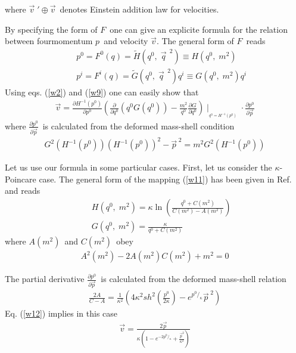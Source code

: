 \documentclass[a4paper,12pt]{article}
\begin{document}
where $\vec{v}\;' \oplus \vec{v}$\ denotes Einstein addition law for velocities.

By specifying the form of $F$\ one can give an explicite formula for the relation between fourmomentum $p$\ and
velocity $\vec{v}$. The general form of $F$\ reads
\begin{eqnarray}
&&p^0=F^0(q)=\tilde{H}(q^0,\;\vec{q}^{\;\;2})\equiv H(q^0,\;m^2)\nonumber \\
&&p^i=F^i(q)=\tilde{G}(q^0,\;\vec{q}^{\;\;2})q^i\equiv G(q^0,\;m^2)q^i \label{w11}
\end{eqnarray}
Using eqs. (\ref{w2}) and (\ref{w9}) one can easily show that
\begin{eqnarray}
\vec{v}=\frac{\partial H^{-1}(p^0)}{\partial p^0}(\frac{\partial }{\partial q^0}(q^0G(q^0))-\frac{m^2}{q^0}
\frac{\partial G}{\partial q^0})\mid_{_{q^0=H^{-1}(p^0)}}\cdot\frac{\partial p^0}{\partial \vec{p}}\label{w12}
\end{eqnarray}
where $\frac{\partial p^0}{\partial \vec{p}}$\ is calculated from the deformed mass-shell condition
\begin{eqnarray}
G^2(H^{-1}(p^0))(H^{-1}(p^0))^2-\vec{p}^{\;2}=m^2G^2(H^{-1}(p^0))\label{w13}
\end{eqnarray}

Let us use our formula in some particular cases. First, let us consider the $\kappa $-Poincare case.
The general form of the mapping (\ref{w11}) has been given in Ref.\cite{b23} and reads
\begin{eqnarray}
&&H(q^0,\;m^2)=\kappa \ln (\frac{q^0+C(m^2)}{C(m^2)-A(m^2)}) \nonumber \\
&&G(q^0,\;m^2)=\frac{\kappa}{q^0+C(m^2)}\label{w14}
\end{eqnarray}
where $A(m^2)$\ and $C(m^2)$\ obey
\begin{eqnarray}
A^2(m^2)-2A(m^2)C(m^2)+m^2=0 \label{w15}
\end{eqnarray}

The partial derivative $\frac{\partial p^0}{\partial \vec{p}}$\ is calculated from the deformed mass-shell relation
\begin{eqnarray}
\frac{2A}{C-A}=\frac{1}{\kappa^2}(4\kappa^2sh^2(\frac{p^0}{2\kappa})-e^{p^0/_{\kappa}}\vec{p}^{\;2})\label{w16}
\end{eqnarray}
Eq. (\ref{w12}) implies in this case 
\begin{eqnarray}
\vec{v}=\frac{2\vec{p}}{\kappa (1-e^{-2p^0/_{\kappa}}+\frac{\vec{p}^2}{\kappa^2})} \label{w17}
\end{eqnarray}
\end{document}
